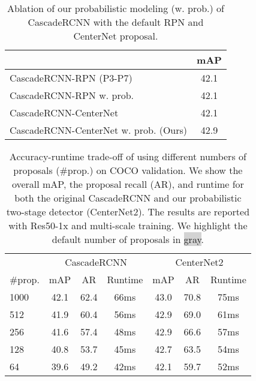\documentclass{article}
\begin{document}
\begin{table}[!t]
\centering
\begin{tabular}{@{}l@{\ \ \ }c@{}}
\toprule
& mAP \\
\midrule
CascadeRCNN-RPN (P3-P7) & 42.1 \\
CascadeRCNN-RPN w. prob. & 42.1 \\
CascadeRCNN-CenterNet & 42.1 \\
\rowcolor{lightgray}CascadeRCNN-CenterNet w. prob. (Ours) & 42.9 \\
\bottomrule
\end{tabular}
\vspace{-2mm}
\caption{
Ablation of our probabilistic modeling (w. prob.) of CascadeRCNN with the default RPN and CenterNet proposal.
}
\label{tab:hyperparameters}
\vspace{-6mm}
\end{table}

\begin{table}[!t]
\centering
\begin{tabular}{@{}l@{\ \ }c@{\ \ \ }c@{\ \ \ }c@{\ \ \ }c@{\ \ \ }c@{\ \ \ }c}
\toprule
 & \multicolumn{3}{c}{CascadeRCNN} & \multicolumn{3}{c}{CenterNet2} \\
\#prop. & mAP & AR & Runtime & mAP & AR & Runtime \\
\cmidrule(r){1-1}
\cmidrule(r){2-4}
\cmidrule(r){5-7}
\rowcolor{lightgray}1000 & 42.1 & 62.4 &  66ms & \cellcolor{white}43.0 & \cellcolor{white}70.8  & \cellcolor{white}75ms \\
512 & 41.9 & 60.4 & 56ms & 42.9 & 69.0 & 61ms \\
\rowcolor{lightgray}\cellcolor{white}256 & \cellcolor{white}41.6 & \cellcolor{white}57.4 & \cellcolor{white} 48ms & 42.9 &  66.6 & 57ms \\
128 & 40.8 & 53.7 & 45ms & 42.7 & 63.5 & 54ms \\
64 & 39.6 & 49.2 & 42ms & 42.1 & 59.7 & 52ms \\
\bottomrule
\end{tabular}
\vspace{-2mm}
\caption{Accuracy-runtime trade-off of using different numbers of proposals (\#prop.) on COCO validation. We show the overall mAP, the proposal recall (AR), and runtime for both the original CascadeRCNN and our probabilistic two-stage detector (CenterNet2). The results are reported with Res50-1x and multi-scale training. We highlight the default number of proposals in \colorbox{lightgray}{gray}.}
\label{table:num_proposals}
\vspace{-6mm}
\end{table}
\end{document}
